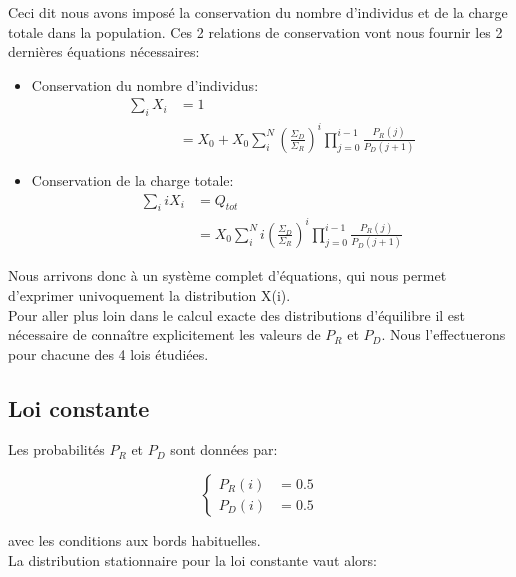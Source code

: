 Ceci dit nous avons imposé la conservation du nombre d'individus et de la charge totale dans la population. Ces 2 relations de conservation vont nous fournir les 2 dernières équations nécessaires:
\begin{itemize}
	\item Conservation du nombre d'individus:
		\begin{equation}
		\begin{aligned}
		\sum_i X_i 	&= 1\\
					&= X_0+X_0 \sum_i^{N} (\frac{\Sigma_D}{\Sigma_R})^i \prod_{j=0}^{i-1}\frac{P_R(j)}{P_D(j+1)}
		\end{aligned}
		\end{equation}
		
	\item Conservation de la charge totale:
		\begin{equation}
		\begin{aligned}
		\sum_i i X_i 	&= Q_{tot}\\
					&= X_0 \sum_i^{N} i (\frac{\Sigma_D}{\Sigma_R})^i \prod_{j=0}^{i-1}\frac{P_R(j)}{P_D(j+1)}
		\end{aligned}
		\end{equation}
\end{itemize}

Nous arrivons donc à un système complet d'équations, qui nous permet d'exprimer univoquement la distribution X(i).\\


Pour aller plus loin dans le calcul exacte des distributions d'équilibre il est nécessaire de connaître explicitement les valeurs de $P_R$ et $P_D$. Nous l'effectuerons pour chacune des 4 lois étudiées.


\subsection{Loi constante}
Les probabilités $P_R$ et $P_D$ sont données par:

\begin{equation}
\left \{
\begin{aligned}
P_R(i) &= 0.5\\
P_D(i) &= 0.5
\end{aligned}
\right.
\end{equation}

avec les conditions aux bords habituelles.\\

La distribution stationnaire pour la loi constante vaut alors:

